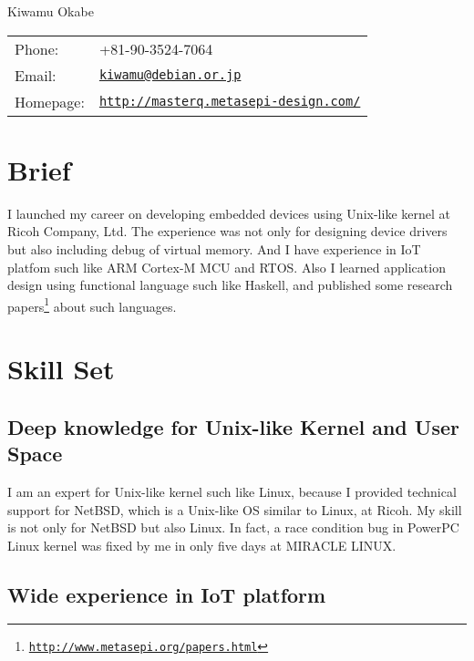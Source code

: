 \documentclass[letterpaper]{article}
\def\name{Kiwamu Okabe}
\begin{document}
{\huge \name}


\vspace{0.25in}

\begin{minipage}{0.3\linewidth}
  \begin{tabular}{ll}
    Phone: & +81-90-3524-7064 \\
    Email: & \href{mailto:kiwamu@debian.or.jp}{\tt kiwamu@debian.or.jp} \\
    Homepage: & \href{http://masterq.metasepi-design.com/}{\tt http://masterq.metasepi-design.com/} \\
  \end{tabular}
\end{minipage}

\section*{Brief}

I launched my career on developing embedded devices using Unix-like kernel at Ricoh Company, Ltd. The experience was not only for designing device drivers but also including debug of virtual memory. And I have experience in IoT platfom such like ARM Cortex-M MCU and RTOS. Also I learned application design using functional language such like Haskell, and published some research papers\footnote{\href{http://www.metasepi.org/papers.html}{\tt http://www.metasepi.org/papers.html}} about such languages.

\section*{Skill Set}

\subsection*{Deep knowledge for Unix-like Kernel and User Space}

I am an expert for Unix-like kernel such like Linux, because I provided technical support for NetBSD, which is a Unix-like OS similar to Linux, at Ricoh. My skill is not only for NetBSD but also Linux. In fact, a race condition bug in PowerPC Linux kernel was fixed by me in only five days at MIRACLE LINUX.

\subsection*{Wide experience in IoT platform}
\end{document}
